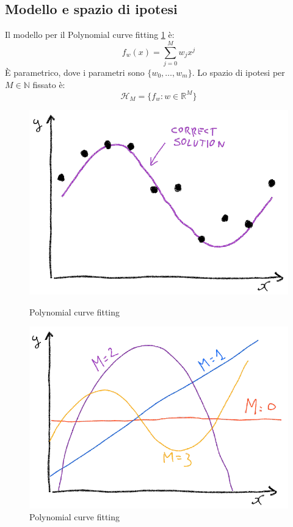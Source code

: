 	\subsection{Modello e spazio di ipotesi}
	Il modello per il Polynomial curve fitting \ref{fig:chapter02-10} \`e:
	$$f_w(x) = \sum\limits_{j = 0}^M w_jx^j$$
	\`E parametrico, dove i parametri sono $\{w_0,\dots, w_m\}$.
	Lo spazio di ipotesi per $M\in\mathbb{N}$ fissato \`e:
	$$\mathcal{H}_M = \{f_w:w\in\mathbb{R}^M\}$$


	\begin{figure}
		\centering
		\begin{minipage}{.5\textwidth}
			\centering
			\includegraphics[width=1\linewidth]{imgs/chapter2/img9}
			\caption{Polynomial curve fitting}
			\label{fig:chapter02-09}
		\end{minipage}%
		\begin{minipage}{.5\textwidth}
			\centering
			\includegraphics[width=1\linewidth]{imgs/chapter2/img10}
			\caption{Polynomial curve fitting}
			\label{fig:chapter02-10}
		\end{minipage}
	\end{figure}




